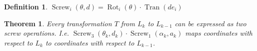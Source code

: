 \documentclass{article}
\newtheorem{theorem}{Theorem}[section]
\theoremstyle{definition}
\newtheorem{definition}{Definition}[section]
\DeclareMathOperator{\Tran}{Tran}
\DeclareMathOperator{\Rot}{Rot}
\DeclareMathOperator{\Screw}{Screw}
\begin{document}
\begin{definition}
$\Screw_i(\theta, d) = \Rot_i(\theta) \cdot \Tran(d e_i)$
\end{definition}

\begin{theorem}
Every transformation $T $ from $L_k$ to $L_{k-1}$ can be expressed as two screw operations. I.e. $\Screw_3(\theta_k, d_k) \cdot \Screw_1(\alpha_k, a_k)$ maps coordinates with respect to $L_k$ to coordinates with respect to $L_{k-1}$.
\end{theorem}
\end{document}

